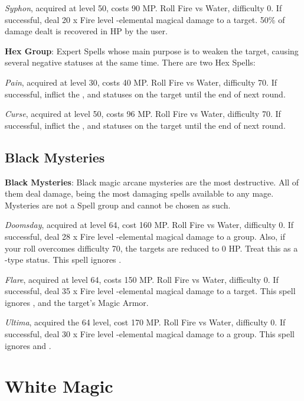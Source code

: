 \begin{multicols}{2}
    \textit{Syphon}, acquired at level 50, costs 90 MP. Roll Fire vs Water, difficulty 0. If successful, deal 20 x Fire level -elemental magical damage to a target. 50\% of damage dealt is recovered in HP by the user.
    
    \textbf{Hex Group}: Expert Spells whose main purpose is to weaken the target, causing several negative statuses at the same time. There are two Hex Spells:
    
    \textit{Pain}, acquired at level 30, costs 40 MP. Roll Fire vs Water, difficulty 70. If successful, inflict the ,  and  statuses on the target until the end of next round.
    
    \textit{Curse}, acquired at level 50, costs 96 MP. Roll Fire vs Water, difficulty 70. If successful, inflict the ,  and  statuses on the target until the end of next round.
    
    \subsection{Black Mysteries}

    \textbf{Black Mysteries}: Black magic arcane mysteries are the most destructive. All of them deal damage, being the most damaging spells available to any mage. Mysteries are not a Spell group and cannot be chosen as such.
    
    \textit{Doomsday}, acquired at level 64, cost 160 MP. Roll Fire vs Water, difficulty 0. If successful, deal 28 x Fire level -elemental magical damage to a group. Also, if your roll overcomes difficulty 70, the targets are reduced to 0 HP. Treat this as a -type status.  This spell ignores .
    
    \textit{Flare}, acquired at level 64, costs 150 MP. Roll Fire vs Water, difficulty 0. If successful, deal 35 x Fire level -elemental magical damage to a target. This spell ignores ,  and the target’s Magic Armor.  
    
    \textit{Ultima}, acquired the 64 level, cost 170 MP. Roll Fire vs Water, difficulty 0. If successful, deal 30 x Fire level -elemental magical damage to a group. This spell ignores  and . 

\end{multicols}

\section{White Magic}

